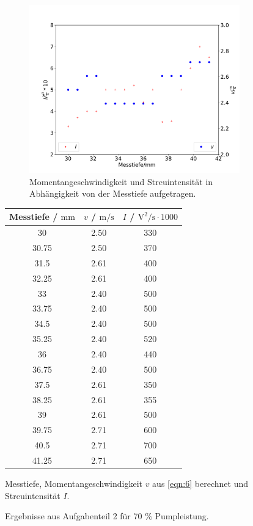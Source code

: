       \begin{figure}
        \begin{subfigure}{0.6\textwidth}
        \centering
        \includegraphics[width=\textwidth]{b70.pdf}
        \caption{Momentangeschwindigkeit und Streuintensität in Abhängigkeit von der Messtiefe aufgetragen.}
        \label{fig:5}
        \qquad
      \end{subfigure}
      \begin{subtable}{0.4\textwidth}
        \centering
        \begin{tabular}{c c c}
          \toprule
          Messtiefe / $\si{\meter\meter}$ & $v$ / $\si{\meter\per\second}$ & $I$ / $\si{\volt\squared\per\second} \cdot 1000$ \\
          \midrule
          30 & 2.50 & 330 \\
          30.75 & 2.50 & 370 \\
          31.5 & 2.61 & 400 \\
          32.25 & 2.61 & 400 \\
          33 & 2.40 & 500 \\
          33.75 & 2.40 & 500 \\
          34.5 & 2.40 & 500 \\
          35.25 & 2.40 & 520 \\
          36 & 2.40 & 440 \\
          36.75 & 2.40 & 500 \\
          37.5 & 2.61 & 350 \\
          38.25 & 2.61 & 355 \\
          39 & 2.61 & 500 \\
          39.75 & 2.71 & 600 \\
          40.5 & 2.71 & 700 \\
          41.25 & 2.71 & 650 \\
          \bottomrule
        \end{tabular}
        \caption{Messtiefe, Momentangeschwindigkeit $v$ aus \eqref{eqn:6} berechnet und Streuintensität $I$.}
        \label{tab:6}
        \qquad
      \end{subtable}
      \caption{Ergebnisse aus Aufgabenteil 2 für 70 $\%$ Pumpleistung.}
    \end{figure}


